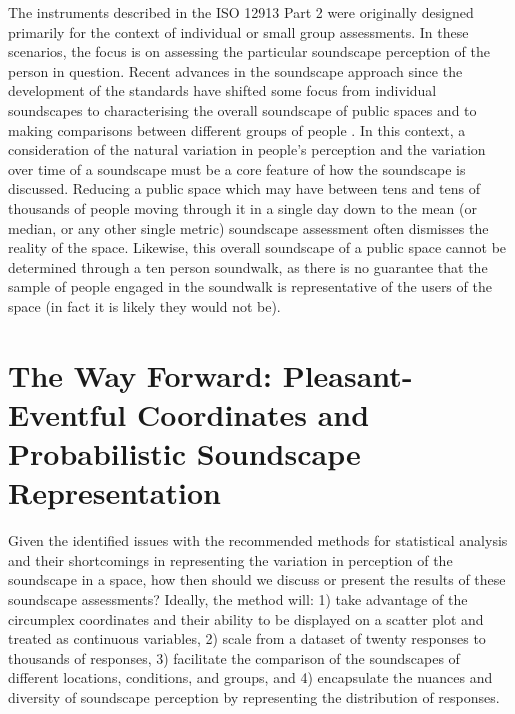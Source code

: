 \documentclass[
  authoryear,
  preprint,
  3p]{elsarticle}
\begin{document}
The instruments described in the ISO 12913 Part 2 \citep{ISO12913_2}
were originally designed primarily for the context of individual or
small group assessments. In these scenarios, the focus is on assessing
the particular soundscape perception of the person in question. Recent
advances in the soundscape approach since the development of the
standards have shifted some focus from individual soundscapes to
characterising the overall soundscape of public spaces
\citep{Mitchell2020Protocol} and to making comparisons between different
groups of people \citep{Jeon2018cross}. In this context, a consideration
of the natural variation in people's perception and the variation over
time of a soundscape must be a core feature of how the soundscape is
discussed. Reducing a public space which may have between tens and tens
of thousands of people moving through it in a single day down to the
mean (or median, or any other single metric) soundscape assessment often
dismisses the reality of the space. Likewise, this overall soundscape of
a public space cannot be determined through a ten person soundwalk, as
there is no guarantee that the sample of people engaged in the soundwalk
is representative of the users of the space (in fact it is likely they
would not be).

\hypertarget{the-way-forward-pleasant-eventful-coordinates-and-probabilistic-soundscape-representation}{%
\section{The Way Forward: Pleasant-Eventful Coordinates and
Probabilistic Soundscape
Representation}\label{the-way-forward-pleasant-eventful-coordinates-and-probabilistic-soundscape-representation}}

Given the identified issues with the recommended methods for statistical
analysis and their shortcomings in representing the variation in
perception of the soundscape in a space, how then should we discuss or
present the results of these soundscape assessments? Ideally, the method
will: 1) take advantage of the circumplex coordinates and their ability
to be displayed on a scatter plot and treated as continuous variables,
2) scale from a dataset of twenty responses to thousands of responses,
3) facilitate the comparison of the soundscapes of different locations,
conditions, and groups, and 4) encapsulate the nuances and diversity of
soundscape perception by representing the distribution of responses.
\end{document}
